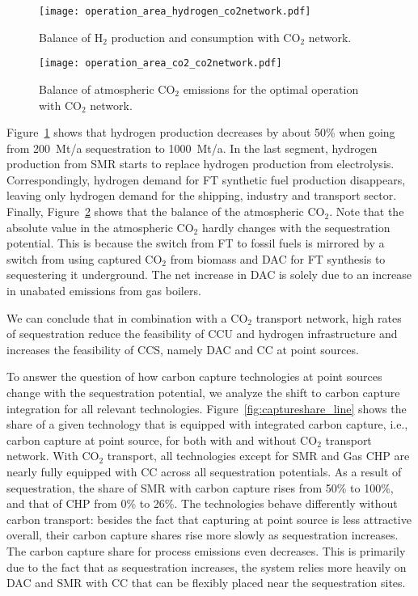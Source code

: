 \documentclass[twocolumn]{article}
\newcommand{\carbon}{CO$_2$}
\newcommand{\hydrogen}{H$_2$}
\begin{document}
\begin{figure}[h]
    \centering
    \texttt{[image: operation\_area\_hydrogen\_co2network.pdf]}
    \caption{Balance of \hydrogen{} production and consumption with \carbon{} network.}
    \label{fig:operation_area_hydrogen_co2network}
\end{figure}
%
\begin{figure}[h]
    \centering
    \texttt{[image: operation\_area\_co2\_co2network.pdf]}
    \caption{Balance of atmospheric \carbon{} emissions for the optimal operation with \carbon{} network.}
    \label{fig:operation_area_co2_co2network}
\end{figure}
%
Figure~\ref{fig:operation_area_hydrogen_co2network} shows that hydrogen production decreases by about 50\% when going from 200~Mt/a sequestration to 1000~Mt/a. In the last segment, hydrogen production from SMR starts to replace hydrogen production from electrolysis. Correspondingly, hydrogen demand for FT synthetic fuel production disappears, leaving only hydrogen demand for the shipping, industry and transport sector. Finally, Figure~\ref{fig:operation_area_co2_co2network} shows that the balance of the atmospheric \carbon{}. Note that the absolute value in the atmospheric \carbon{} hardly changes with the sequestration potential. This is because the switch from FT to fossil fuels is mirrored by a switch from using captured \carbon{} from biomass and DAC for FT synthesis to sequestering it underground. The net increase in DAC is solely due to an increase in unabated emissions from gas boilers.


We can conclude that in combination with a \carbon{} transport network, high rates of sequestration reduce the feasibility of CCU and hydrogen infrastructure and increases the feasibility of CCS, namely DAC and CC at point sources.

To answer the question of how carbon capture technologies at point sources change with the sequestration potential, we analyze the shift to carbon capture integration for all relevant technologies.
Figure~\ref{fig:captureshare_line} shows the share of a given technology that is equipped with integrated carbon capture, i.e., carbon capture at point source, for both with and without \carbon{} transport network.
With \carbon{} transport, all technologies except for SMR and Gas CHP are nearly fully equipped with CC across all sequestration potentials. As a result of sequestration, the share of SMR with carbon capture rises from 50\% to 100\%, and that of CHP from 0\% to 26\%. The technologies behave differently without carbon transport: besides the fact that capturing at point source is less attractive overall, their carbon capture shares rise more slowly as sequestration increases. The carbon capture share for process emissions even decreases. This is primarily due to the fact that as sequestration increases, the system relies more heavily on DAC and SMR with CC that can be flexibly placed near the sequestration sites.
\end{document}
